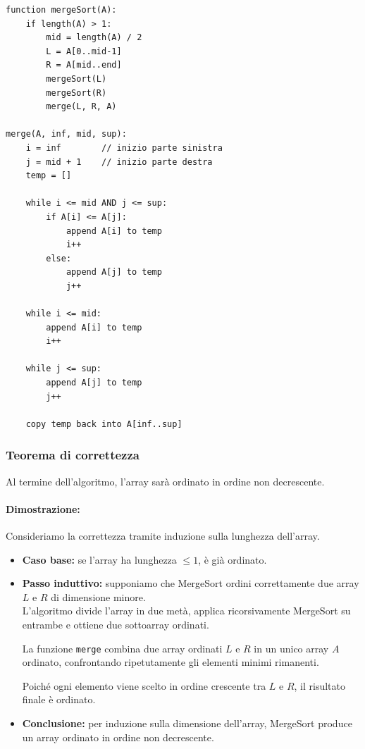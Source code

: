 \documentclass[a4paper,12pt]{article}
\begin{document}
\begin{lstlisting}
function mergeSort(A):
    if length(A) > 1:
        mid = length(A) / 2
        L = A[0..mid-1]
        R = A[mid..end]
        mergeSort(L)
        mergeSort(R)
        merge(L, R, A)

merge(A, inf, mid, sup):
    i = inf        // inizio parte sinistra
    j = mid + 1    // inizio parte destra
    temp = []

    while i <= mid AND j <= sup:
        if A[i] <= A[j]:
            append A[i] to temp
            i++
        else:
            append A[j] to temp
            j++

    while i <= mid:
        append A[i] to temp
        i++

    while j <= sup:
        append A[j] to temp
        j++

    copy temp back into A[inf..sup]
\end{lstlisting}
\subsubsection{Teorema di correttezza}
Al termine dell'algoritmo, l'array sarà ordinato in ordine non decrescente.
\paragraph{Dimostrazione:}
Consideriamo la correttezza tramite induzione sulla lunghezza dell'array.

\begin{itemize}
    \item \textbf{Caso base:} se l'array ha lunghezza $\le 1$, è già ordinato.

    \item \textbf{Passo induttivo:} supponiamo che MergeSort ordini correttamente due array $L$ e $R$ di dimensione minore.\\
    L'algoritmo divide l'array in due metà, applica ricorsivamente MergeSort su entrambe e ottiene due sottoarray ordinati.

    La funzione \texttt{merge} combina due array ordinati $L$ e $R$ in un unico array $A$ ordinato, confrontando ripetutamente gli elementi minimi rimanenti.

    Poiché ogni elemento viene scelto in ordine crescente tra $L$ e $R$, il risultato finale è ordinato.

    \item \textbf{Conclusione:} per induzione sulla dimensione dell'array, MergeSort produce un array ordinato in ordine non decrescente.
\end{itemize}
\end{document}
